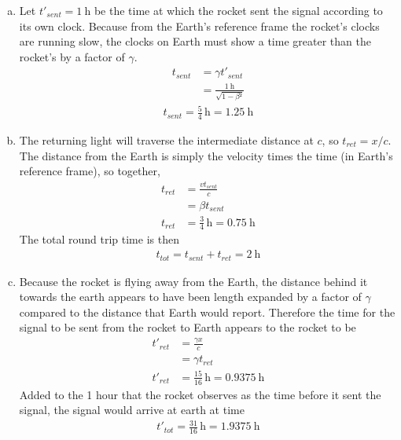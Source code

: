 \begin{enumerate}[(a)]
    \item
        Let $t'_{sent} = \SI{1}{\hour}$ be the time at which the rocket sent
        the signal according to its own clock. Because from the Earth's
        reference frame the rocket's clocks are running slow, the clocks on
        Earth must show a time greater than the rocket's by a factor of $γ$.
        \begin{align*}
            t_{sent} &= γt'_{sent} \\
            {} &= \frac{\SI{1}{\hour}}{\sqrt{1 - β²}}
        \end{align*}
        \begin{align}
            \boxed{ t_{sent} = \frac 54 \,\si{\hour} = \SI{1.25}{\hour} }
        \end{align}
    \item
        The returning light will traverse the intermediate distance at $c$, so
        $t_{ret} = x/c$. The distance from the Earth is simply the velocity
        times the time (in Earth's reference frame), so together,
        \begin{align*}
            t_{ret} &= \frac{vt_{sent}}{c} \\
            {} &= βt_{sent} \\
            t_{ret} &= \frac 34 \,\si{\hour} = \SI{0.75}{\hour}
        \end{align*}
        The total round trip time is then
        \begin{align}
            \boxed{ t_{tot} = t_{sent} + t_{ret} = \SI{2}{\hour} }
        \end{align}
    \item
        Because the rocket is flying away from the Earth, the distance behind
        it towards the earth appears to have been length expanded by a factor
        of $γ$ compared to the distance that Earth would report. Therefore the
        time for the signal to be sent from the rocket to Earth appears to the
        rocket to be
        \begin{align*}
            t'_{ret} &= \frac{γx}{c} \\
            {} &= γt_{ret} \\
            t'_{ret} &= \frac{15}{16} \,\si{\hour} = \SI{0.9375}{\hour}
        \end{align*}
        Added to the 1 hour that the rocket observes as the time before it
        sent the signal, the signal would arrive at earth at time
        \begin{align*}
            \boxed{ t'_{tot} = \frac{31}{16} \,\si{\hour} = \SI{1.9375}{\hour} }
        \end{align*}
\end{enumerate}
